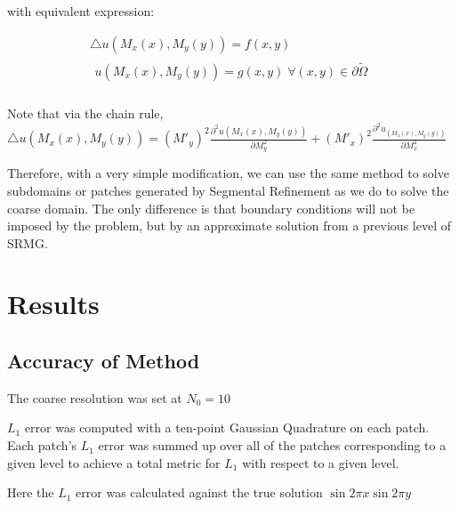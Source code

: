\documentclass[final]{siamart1116}
\numberwithin{theorem}{section}
\begin{document}
with equivalent expression: 

\begin{gather}
  \bigtriangleup u(M_x(x), M_y(y)) = f(x, y) \\  
  \begin{split}
    u(M_x(x), M_y(y)) = g(x,y)  \; \forall (x, y) \in  \partial \tilde{\Omega}  \nonumber \\
  \end{split}
\end{gather}

Note that via the chain rule, $\bigtriangleup u(M_x(x), M_y(y)) = (M'_y)^2 \frac{\partial^2 u(M_x(x), M_y(y)) }{\partial M_y^2} + (M'_x)^2 \frac{\partial^2 u_(M_x(x), M_y(y)) }{\partial M_x^2}$    

Therefore, with a very simple modification, we can use the same method to solve subdomains or patches generated by Segmental Refinement as we do to solve the coarse domain. The only difference is that boundary conditions will not be imposed by the problem, but by an approximate solution from a previous level of SRMG. 



\section{Results}\label{sec:results}

\subsection{Accuracy of Method}

The coarse resolution was set at $N_0 = 10$

$L_1$ error was computed with a ten-point Gaussian Quadrature on each patch. Each patch's $L_1$ error was summed up over all of the patches corresponding to a given level to achieve a total metric for $L_1$ with respect to a given level.  



Here the $L_1$ error was calculated against the true solution $\sin{2\pi x}\sin{2 \pi y} $
\end{document}

